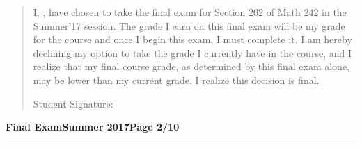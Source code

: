 \documentclass[12pt]{article}
\theoremstyle{definition}
\begin{document}
\begin{quotation}
\noindent I, \makebox[8cm]{\hrulefill}, have chosen to take the final exam for Section 202 of Math 242 in the Summer'17 session.  The grade I earn on this final exam will be my grade for the course and once I begin this exam, I must complete it.  I am hereby declining my option to take the grade I currently have in the course, and I realize that my final course grade, as determined by this final exam alone, may be lower than my current grade.  I realize this decision is final.

\medskip

Student Signature: \makebox[8cm]{\hrulefill}


\end{quotation}
\newpage

\hfill{\large\bf Final Exam}\hfill{\large\bf Summer 2017}\hfill{\large\bf Page 2/10}\hrule
\end{document}
